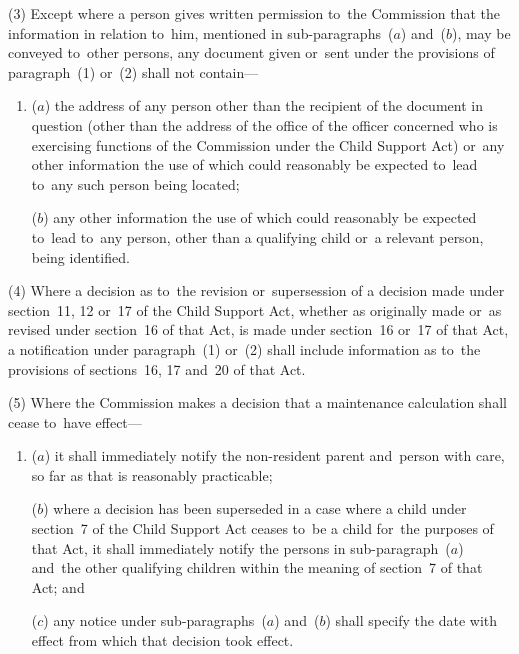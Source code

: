 \documentclass[12pt,a4paper]{article}
\begin{document}
{(3) Except where a person gives written permission to~the 
Commission  %
that the information in relation to~him, mentioned in sub-paragraphs~($a$)  and~($b$), may be conveyed to~other persons, any document given or~sent under the provisions of paragraph~(1) or~(2) shall not contain—
\begin{enumerate}\item[]
($a$) the address of any person other than the recipient of the document in question (other than the address of the office of the officer concerned who is exercising functions of the 
Commission  %
under the Child Support Act) or~any other information the use of which could reasonably be expected to~lead to~any such person being located;

($b$) any other information the use of which could reasonably be expected to~lead to~any person, other than a qualifying child or~a relevant person, being identified.
\end{enumerate}

(4) Where a decision as to~the revision or~supersession of a decision made under section~11, 12 or~17 of the Child Support Act, whether as originally made or~as revised under section~16 of that Act, is made under section~16 or~17 of that Act, a notification under paragraph~(1) or~(2) shall include information as to~the provisions of sections~16, 17 and~20 of that Act.

(5) Where the 
Commission  %
makes a decision that a maintenance calculation shall cease to~have effect—
\begin{enumerate}\item[]
($a$) 
it  %
shall immediately notify the non-resident parent and~person with care, so far as that is reasonably practicable;

($b$) where a decision has been superseded in a case where a child under section~7 of the Child Support Act ceases to~be a child for~the purposes of that Act, 
it  %
shall immediately notify the persons in sub-paragraph~($a$)  and~the other qualifying children within the meaning of section~7 of that Act; and

($c$) any notice under sub-paragraphs~($a$)  and~($b$)  shall specify the date with effect from which that decision took effect.
\end{enumerate}

}
\end{document}
